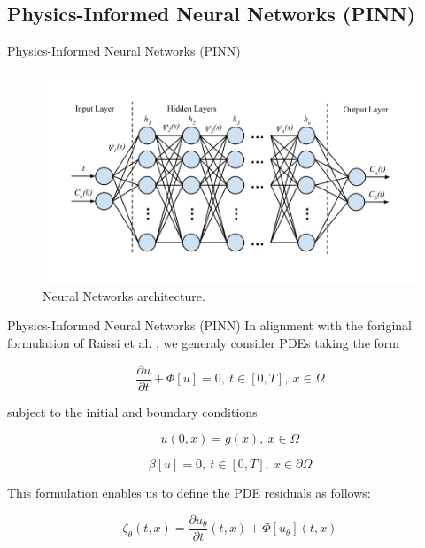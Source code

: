 \documentclass[serif,8pt, aspectratio=169]{beamer}
\begin{document}
\subsection{Physics-Informed Neural Networks (PINN)}
 
\begin{frame}[fragile]{Physics-Informed Neural Networks (PINN)}
    \begin{figure}
        \centering
        \includegraphics[width=0.8\linewidth]{pic/Imune_pinn_model.png}
        \caption{Neural Networks architecture.}
        \label{fig:pinn-selection}
    \end{figure}
\end{frame}

\begin{frame}[fragile]{Physics-Informed Neural Networks (PINN)}
    In alignment with the foriginal formulation of Raissi et al. \cite{raissi2019physics}, we generaly consider PDEs taking the form
    
    \begin{equation}
        \frac{\partial u}{\partial t} + \Phi[u] = 0,~t\in [0,T],~x \in \Omega
    \end{equation}
    
    subject to the initial and boundary conditions
    
    \begin{equation}
        u(0,x)=g(x),~x\in\Omega 
    \end{equation}
    
    \begin{equation}
        \beta [u]=0,~t\in[0,T],~x\in\partial\Omega
    \end{equation}

    This formulation enables us to define the PDE residuals as follows:

    \begin{equation}
        \zeta_\theta (t,x) = \frac{\partial u_\theta}{\partial t}(t,x) + \Phi[u_\theta](t,x)
    \end{equation}

    
\end{frame}
\end{document}
